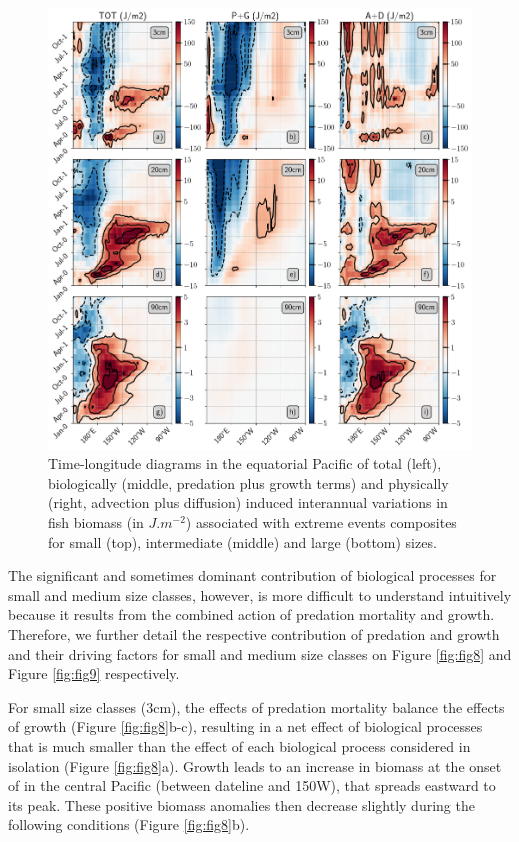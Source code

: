 \begin{figure}[h!tp]
	\centering
	\includegraphics[scale=0.4]{figs/fig7.png}	
	\caption{Time-longitude diagrams in the equatorial Pacific of total (left), biologically (middle, predation plus growth terms) and physically (right, advection plus diffusion) induced interannual variations in fish biomass (in $J.m^{-2}$) associated with extreme \nino{} events composites for small (top), intermediate (middle) and large (bottom) sizes.}
	\label{fig:fig7}
\end{figure}

The significant and sometimes dominant contribution of biological processes for small and medium size classes, however, is more difficult to understand intuitively because it results from the combined action of predation mortality and growth. Therefore, we further detail the respective contribution of predation and growth and their driving factors for small and medium size classes on Figure \ref{fig:fig8} and Figure \ref{fig:fig9} respectively.

For small size classes (3cm), the effects of predation mortality balance the effects of growth (Figure \ref{fig:fig8}b-c), resulting in a net effect of biological processes that is much smaller than the effect of each biological process considered in isolation (Figure \ref{fig:fig8}a). Growth leads to an increase in biomass at the onset of \nino{} in the central Pacific (between dateline and 150\degree{}W), that spreads eastward to its peak. These positive biomass anomalies then decrease slightly during the following \nina{} conditions (Figure \ref{fig:fig8}b).

